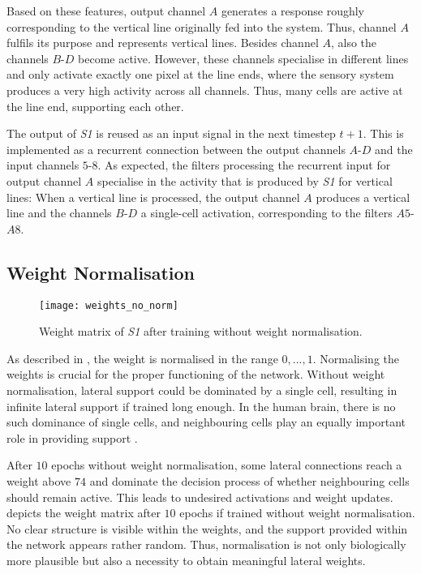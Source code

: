 Based on these features, output channel $A$ generates a response roughly corresponding to the vertical line originally fed into the system.
Thus, channel $A$ fulfils its purpose and represents vertical lines.
Besides channel $A$, also the channels $B$-$D$ become active.
However, these channels specialise in different lines and only activate exactly one pixel at the line ends, where the sensory system produces a very high activity across all channels.
Thus, many cells are active at the line end, supporting each other.

The output of \emph{S1} is reused as an input signal in the next timestep $t+1$.
This is implemented as a recurrent connection between the output channels $A$-$D$ and the input channels $5$-$8$.
As expected, the filters processing the recurrent input for output channel $A$ specialise in the activity that is produced by \emph{S1} for vertical lines:
When a vertical line is processed, the output channel $A$ produces a vertical line and the channels $B$-$D$ a single-cell activation, corresponding to the filters $A5$-$A8$.


\subsection{Weight Normalisation}
%
\begin{figure}[h]
    \centering
    \texttt{[image: weights\_no\_norm]}
    \caption[Weights after training without normalisation]{Weight matrix of \emph{S1} after training without weight normalisation.}
\end{figure}
%
As described in , the weight is normalised in the range $0, ..., 1$.
Normalising the weights is crucial for the proper functioning of the network. Without weight normalisation, lateral support could be dominated by a single cell, resulting in infinite lateral support if trained long enough. In the human brain, there is no such dominance of single cells, and neighbouring cells play an equally important role in providing support .

After $10$ epochs without weight normalisation, some lateral connections reach a weight above $74$ and dominate the decision process of whether neighbouring cells should remain active.
This leads to undesired activations and weight updates. 
 depicts the weight matrix after $10$ epochs if trained without weight normalisation.
No clear structure is visible within the weights, and the support provided within the network appears rather random. 
Thus, normalisation is not only biologically more plausible but also a necessity to obtain meaningful lateral weights.



